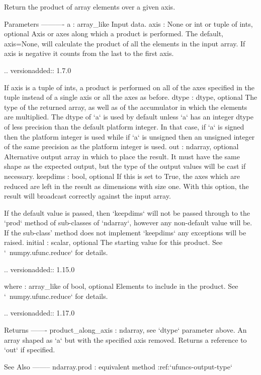 \begin{DoxyVerb}Return the product of array elements over a given axis.

Parameters
----------
a : array_like
    Input data.
axis : None or int or tuple of ints, optional
    Axis or axes along which a product is performed.  The default,
    axis=None, will calculate the product of all the elements in the
    input array. If axis is negative it counts from the last to the
    first axis.

    .. versionadded:: 1.7.0

    If axis is a tuple of ints, a product is performed on all of the
    axes specified in the tuple instead of a single axis or all the
    axes as before.
dtype : dtype, optional
    The type of the returned array, as well as of the accumulator in
    which the elements are multiplied.  The dtype of `a` is used by
    default unless `a` has an integer dtype of less precision than the
    default platform integer.  In that case, if `a` is signed then the
    platform integer is used while if `a` is unsigned then an unsigned
    integer of the same precision as the platform integer is used.
out : ndarray, optional
    Alternative output array in which to place the result. It must have
    the same shape as the expected output, but the type of the output
    values will be cast if necessary.
keepdims : bool, optional
    If this is set to True, the axes which are reduced are left in the
    result as dimensions with size one. With this option, the result
    will broadcast correctly against the input array.

    If the default value is passed, then `keepdims` will not be
    passed through to the `prod` method of sub-classes of
    `ndarray`, however any non-default value will be.  If the
    sub-class' method does not implement `keepdims` any
    exceptions will be raised.
initial : scalar, optional
    The starting value for this product. See `~numpy.ufunc.reduce` for details.

    .. versionadded:: 1.15.0

where : array_like of bool, optional
    Elements to include in the product. See `~numpy.ufunc.reduce` for details.

    .. versionadded:: 1.17.0

Returns
-------
product_along_axis : ndarray, see `dtype` parameter above.
    An array shaped as `a` but with the specified axis removed.
    Returns a reference to `out` if specified.

See Also
--------
ndarray.prod : equivalent method
:ref:`ufuncs-output-type`


\end{DoxyVerb}
